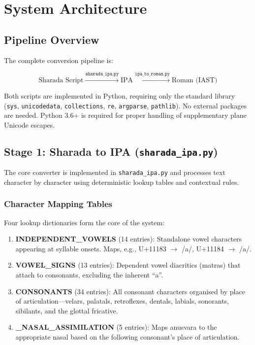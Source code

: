 \documentclass[11pt]{article}
\begin{document}
\section{System Architecture}

\subsection{Pipeline Overview}
The complete conversion pipeline is:

\[
\text{Sharada Script} \xrightarrow{\texttt{sharada\_ipa.py}} \text{IPA} \xrightarrow{\texttt{ipa\_to\_roman.py}} \text{Roman (IAST)}
\]

Both scripts are implemented in Python, requiring only the standard library (\texttt{sys}, \texttt{unicodedata}, \texttt{collections}, \texttt{re}, \texttt{argparse}, \texttt{pathlib}). No external packages are needed. Python 3.6+ is required for proper handling of supplementary plane Unicode escapes.

\subsection{Stage 1: Sharada to IPA (\texttt{sharada\_ipa.py})}

The core converter is implemented in \texttt{sharada\_ipa.py} and processes text character by character using deterministic lookup tables and contextual rules.

\subsubsection{Character Mapping Tables}
Four lookup dictionaries form the core of the system:

\begin{enumerate}
    \item \textbf{INDEPENDENT\_VOWELS} (14 entries): Standalone vowel characters appearing at syllable onsets. Maps, e.g., U+11183 $\rightarrow$ /a/, U+11184 $\rightarrow$ /a\textlengthmark/.
    \item \textbf{VOWEL\_SIGNS} (13 entries): Dependent vowel diacritics (matras) that attach to consonants, excluding the inherent ``a''.
    \item \textbf{CONSONANTS} (34 entries): All consonant characters organised by place of articulation---velars, palatals, retroflexes, dentals, labials, sonorants, sibilants, and the glottal fricative.
    \item \textbf{\_NASAL\_ASSIMILATION} (5 entries): Maps anusvara to the appropriate nasal based on the following consonant's place of articulation.
\end{enumerate}
\end{document}
